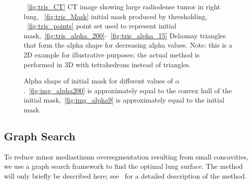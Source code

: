 \documentclass{llncs}
\begin{document}
\begin{figure}[ht!]
{  \label{fig:tris_alpha_50}
  }
  \caption{~\ref{fig:tris_CT} CT image showing large radiodense tumor in right lung, ~\ref{fig:tris_Mask} initial mask produced by thresholding, ~\ref{fig:tris_points} point set used to represent initial mask,~\ref{fig:tris_alpha_200}-~\ref{fig:tris_alpha_15} Delaunay triangles that form the alpha shape for decreasing alpha values. Note: this is a 2D example for illustrative purposes; the actual method is performed in 3D with tetrahedrons instead of triangles. }
  \label{fig:tris}
\end{figure}


\begin{figure}[t]
  \centering
  \caption{Alpha shape of initial mask for different values of $\alpha$.~\ref{fig:img_alpha200} is approximately equal to the convex hull of the initial mask,~\ref{fig:img_alpha9} is approximately equal to the initial mask.}
  \label{fig:alphashapes}
\end{figure}
%
\subsection{Graph Search}
%
To reduce minor mediastinum oversegmentation resulting from small concavities, we use a graph search framework to find the optimal lung surface. The method will only briefly be described here; see~\cite{li2006} for a detailed description of the method. 
\end{document}
